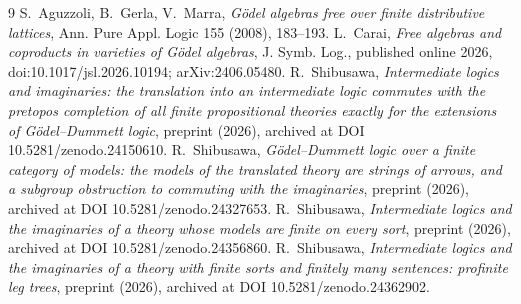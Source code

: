 \documentclass[11pt]{amsart}
\theoremstyle{definition}
\begin{document}
\begin{thebibliography}{9}
 S.~Aguzzoli, B.~Gerla, V.~Marra, \emph{G\"odel algebras
free over finite distributive lattices}, Ann. Pure Appl. Logic 155
(2008), 183--193.
 L.~Carai, \emph{Free algebras and coproducts in
varieties of G\"odel algebras}, J. Symb. Log., published online 2026,
doi:10.1017/jsl.2026.10194; arXiv:2406.05480.
 R.~Shibusawa, \emph{Intermediate logics and
imaginaries: the translation into an intermediate logic commutes with
the pretopos completion of all finite propositional theories exactly
for the extensions of G\"odel--Dummett logic}, preprint (2026),
archived at DOI 10.5281/zenodo.24150610.
 R.~Shibusawa, \emph{G\"odel--Dummett logic over a
finite category of models: the models of the translated theory are
strings of arrows, and a subgroup obstruction to commuting with the
imaginaries}, preprint (2026), archived at DOI
10.5281/zenodo.24327653.
 R.~Shibusawa, \emph{Intermediate logics and the
imaginaries of a theory whose models are finite on every sort},
preprint (2026), archived at DOI 10.5281/zenodo.24356860.
 R.~Shibusawa, \emph{Intermediate logics and the
imaginaries of a theory with finite sorts and finitely many sentences:
profinite leg trees}, preprint (2026), archived at DOI
10.5281/zenodo.24362902.
\end{thebibliography}
\end{document}

